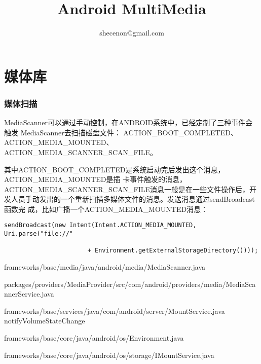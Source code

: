 \documentclass[a4paper,10pt,twoside]{article}%
\title{Android MultiMedia}
\author{shecenon@gmail.com}
\begin{document}
\ttfamily
\maketitle
\tableofcontents
\printindex
\newpage
\newcommand{\invoke}[1]{\\ -\textgreater\hspace{#1}}


\part{媒体库}
\section{媒体扫描}
MediaScanner可以通过手动控制，在ANDROID系统中，已经定制了三种事件会触发
MediaScanner去扫描磁盘文件：\newline
ACTION_BOOT_COMPLETED、ACTION_MEDIA_MOUNTED、 ACTION_MEDIA_SCANNER_SCAN_FILE。

其中ACTION_BOOT_COMPLETED是系统启动完后发出这个消息，ACTION_MEDIA_MOUNTED是插
卡事件触发的消息，ACTION_MEDIA_SCANNER_SCAN_FILE消息一般是在一些文件操作后，开
发人员手动发出的一个重新扫描多媒体文件的消息。发送消息通过sendBroadcast函数完
成，比如广播一个ACTION_MEDIA_MOUNTED消息：

\begin{lstlisting}
sendBroadcast(new Intent(Intent.ACTION_MEDIA_MOUNTED, Uri.parse("file://"

                       + Environment.getExternalStorageDirectory())));

                   \end{lstlisting}


frameworks/base/media/java/android/media/MediaScanner.java

packages/providers/MediaProvider/src/com/android/providers/media/MediaScannerService.java

frameworks/base/services/java/com/android/server/MountService.java
notifyVolumeStateChange


frameworks/base/core/java/android/os/Environment.java

frameworks/base/core/java/android/os/storage/IMountService.java
\end{document}
